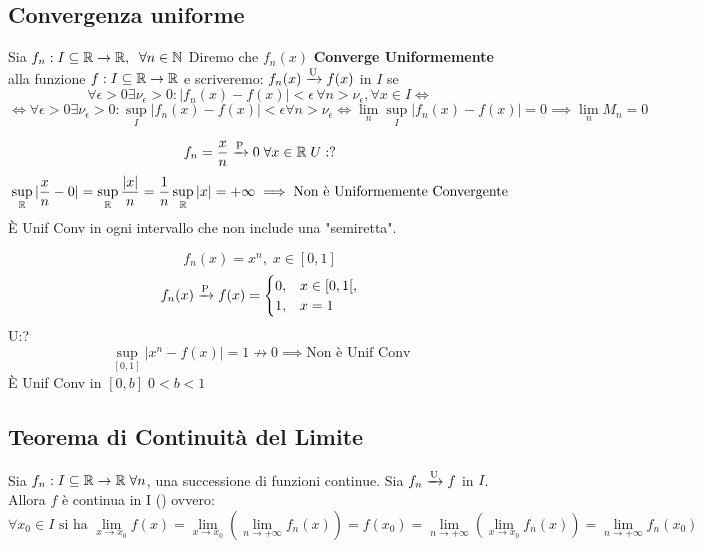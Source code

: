 \subsection{Convergenza uniforme}

    \begin{definition}
        Sia \(f_{n}: I \sube \R \to \R, \; \forall n \in \N\)
        Diremo che \(f_{n}(x)\) \textbf{Converge Uniformemente} alla funzione \(f: I \subseteq \mathbb{R} \to \mathbb{R}\) e scriveremo: \(f_{n}(x)\xrightarrow{\mathrm{U}}f(x)\) in \(I\)
        se \[\forall \epsilon > 0 \exists \nu_{\epsilon}>0 : |f_{n}(x)-f(x)| < \epsilon \, \forall n > \nu_{\epsilon}, \forall x \in I \iff\]
        \[
        \iff \forall \epsilon>0 \exists \nu_{\epsilon}>0 : \sup_{I}|f_{n}(x)-f(x)| <\epsilon \forall n > \nu_{\epsilon} \iff \lim_{n} \sup_{I}|f_{n}(x)-f(x)| = 0 \implies \lim_{n} M_{n} = 0
        \]
    \end{definition}

    \begin{example}
        \[
        f_{n} = \frac{x}{n} \conv{P} 0 \forall x\in \R \; U:?
        \]
        \[
        \sup_{\mathbb{R}} | \frac{x}{n} - 0| = \sup_{\mathbb{R}} \frac{|x|}{n} = \frac{1}{n} \sup_{\mathbb{R}} |x| = +\infty \implies \text{Non è Uniformemente Convergente}
        \] 
        È Unif Conv in ogni intervallo che non include una "semiretta".
    \end{example}
    \begin{example}
        \[
    f_{n}(x) = x^n, \; x \in [0,1]
    \]
    \[
    f_{n}(x) \xrightarrow{\mathrm{P}} f(x) = \begin{cases}
        0, & x \in [0,1[,\\
        1, & x=1
    \end{cases}
    \]
    U:?
    \[
    \sup_{[0,1]} |x^n - f(x)| = 1 \not \to 0 \implies \text{Non è Unif Conv}
    \]
    È Unif Conv in \([0,b] \; 0<b<1\) 
    \end{example}

\subsection{Teorema di Continuità del Limite}
\begin{theorem}
    Sia \(f_{n}: I \sube\R \to \R \forall n\), una successione di funzioni continue.
    Sia \(f_{n}\xrightarrow{\mathrm{U}} f\) in \(I\).
    Allora \(f\) è continua in I () ovvero:
    \[
    \forall x_{0} \in I \text{ si ha } \lim_{x\to x_{0}} f(x) = \lim_{x\to x_{0}}(\lim_{n\to +\infty} f_{n}(x))= f(x_{0}) =\lim_{n\to +\infty }(\lim_{x\to x_{0}} f_{n}(x)) = \lim_{n \to +\infty }f_{n}(x_{0})
    \]
\end{theorem}

